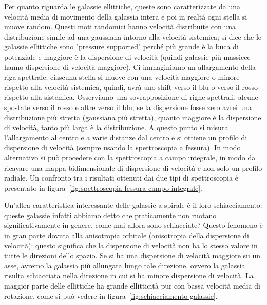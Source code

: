 Per quanto riguarda le galassie ellittiche, queste sono caratterizzate da una velocità media di movimento della galassia intera e poi in realtà ogni stella si muove random. Questi moti randomici hanno velocità distribuite con una distribuzione simile ad una gaussiana intorno alla velocità sistemica; si dice che le galassie ellittiche sono "pressure supported" perché più grande è la buca di potenziale e maggiore è la dispersione di velocità (quindi galassie più massicce hanno dispersione di velocità maggiore). Ci immaginiamo un allargamento della riga spettrale: ciascuna stella si muove con una velocità maggiore o minore rispetto alla velocità sistemica, quindi, avrà uno shift verso il blu o verso il rosso rispetto alla sistemica. Osserviamo una sovrapposizione di righe spettrali, alcune spostate verso il rosso e altre verso il blu; se la dispersione fosse zero avrei una distribuzione più stretta (gaussiana più stretta), quanto maggiore è la dispersione di velocità, tanto più larga è la distribuzione. A questo punto si misura l’allargamento al centro e a varie distanze dal centro e si ottiene un profilo di dispersione di velocità (sempre usando la spettroscopia a fessura). In modo alternativo si può procedere con la spettroscopia a campo integrale, in modo da ricavare una mappa bidimensionale di dispersione di velocità e non solo un profilo radiale. Un confronto tra i risultati ottenuti dai due tipi di spettroscopia è presentato in figura~\ref{fig:spettroscopia-fessura-campo-integrale}.

Un'altra caratteristica interessante delle galassie a spirale è il loro schiacciamento: queste galassie infatti abbiamo detto che praticamente non ruotano significativamente in genere, come mai allora sono schiacciate? Questo fenomeno è in gran parte dovuta alla anisotropia orbitale (anisotropia della dispersione di velocità): questo significa che la dispersione di velocità non ha lo stesso valore in tutte le direzioni dello spazio. Se si ha una dispersione di velocità maggiore su un asse, avremo la galassia più allungata lungo tale direzione, ovvero la galassia risulta schiacciata nella direzione in cui si ha minore dispersione di velocità. La maggior parte delle ellittiche ha grande ellitticità pur con bassa velocità media di rotazione, come si può vedere in figura~\ref{fig:schiacciamento-galassie}.
